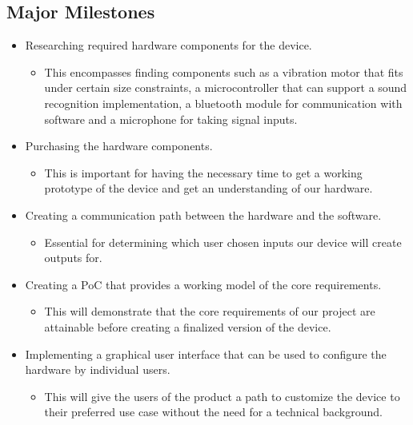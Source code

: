 \documentclass{article}
\begin{document}
\subsection*{Major Milestones}

\begin{itemize}
	\item Researching required hardware components for the device.
	\begin{itemize}
		\item This encompasses finding components such as a vibration motor that fits under certain size constraints, a microcontroller that can support a sound recognition implementation, a bluetooth module for communication with software and a microphone for taking signal inputs. 
	\end{itemize}
\end{itemize}

\begin{itemize}
	\item Purchasing the hardware components.
	\begin{itemize}
		\item This is important for having the necessary time to get a working prototype of the device and get an understanding of our hardware. 
	\end{itemize}
\end{itemize}

\begin{itemize}
	\item Creating a communication path between the hardware and the software.
	\begin{itemize}
		\item Essential for determining which user chosen inputs our device will create outputs for. 
	\end{itemize}
\end{itemize}

\begin{itemize}
	\item Creating a PoC that provides a working model of the core requirements.
	\begin{itemize}
		\item This will demonstrate that the core requirements of our project are attainable before creating a finalized version of the device. 
	\end{itemize}
\end{itemize}

\begin{itemize}
	\item Implementing a graphical user interface that can be used to configure the hardware by individual users.
	\begin{itemize}
		\item This will give the users of the product a path to customize the device to their preferred use case without the need for a technical background. 
	\end{itemize}
\end{itemize}
\end{document}
